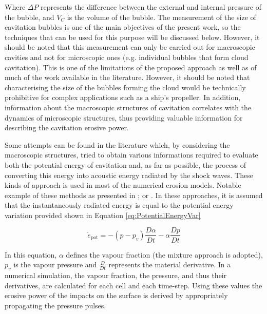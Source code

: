 Where $\Delta P$ represents the difference between the external and internal pressure of the bubble, and $V_C$ is the volume of the bubble. 
The measurement of the size of cavitation bubbles is one of the main objectives of the present work, so the techniques that can be used for this purpose will be discussed below. However, it should be noted that this measurement can only be carried out for macroscopic cavities and not for microscopic ones (e.g. individual bubbles that form cloud cavitation).
This is one of the limitations of the proposed approach as well as of much of the work available in the literature. However, it should be noted that characterising the size of the bubbles forming the cloud would be technically prohibitive for complex applications such as a ship's propeller. In addition, information about the macroscopic structures of cavitation correlates with the dynamics of microscopic structures, thus providing valuable information for describing the cavitation erosive power.

Some attempts can be found in the literature which, by considering the macroscopic structures, tried to obtain
various informations required to evaluate both the potential energy of cavitation and, as far as possible, the process of converting this energy into acoustic energy radiated by the shock waves. 
These kinds of approach is used in most of the numerical erosion models. Notable example of these methods as presented in \cite{Köksal2021}; \cite{Leclercq2017} or \cite{Usta2019}.
In these approaches, it is assumed that the instantaneously radiated energy is equal to the potential energy variation provided shown in Equation \ref{eq:PotentialEnergyVar}

\begin{equation}
    \dot{e}_{\text{pot}} = -\left(p - p_v\right) \frac{D\alpha}{Dt} - \alpha \frac{Dp}{Dt}
    \label{eq:PotentialEnergyVar}
\end{equation}

In this equation, $\alpha$ defines the vapour fraction (the mixture approach is adopted), $p_v$ is the vapour pressure and $\frac{D}{Dt}$ represents the material derivative.
In a numerical simulation, the vapour fraction, the pressure, and thus their derivatives, are calculated for each cell and each time-step. Using these values the erosive power of the impacts on the surface is derived by appropriately propagating the pressure pulses. 

